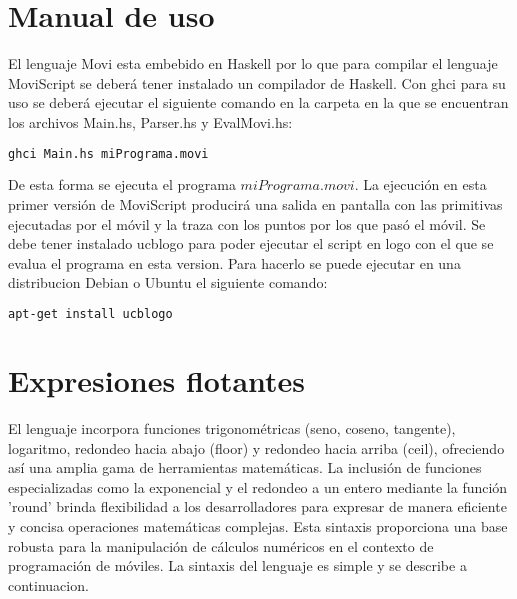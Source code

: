 \documentclass[11pt]{scrartcl}
\begin{document}
\pagebreak
\section{Manual de uso}
El lenguaje Movi esta embebido en Haskell por lo que para compilar el lenguaje MoviScript 
se deber\'a tener instalado un compilador de Haskell. Con ghci para su uso se deber\'a 
ejecutar el siguiente comando en la carpeta en la que se encuentran los archivos Main.hs,
Parser.hs y EvalMovi.hs:
\begin{lstlisting}[language=bash]
    ghci Main.hs miPrograma.movi
\end{lstlisting}
De esta forma se ejecuta el programa $miPrograma.movi$. La ejecuci\'on en esta primer versi\'on de 
MoviScript producir\'a una salida en pantalla con las primitivas ejecutadas por el m\'ovil y la traza
 con los puntos por los que pas\'o el m\'ovil.
 Se debe tener instalado ucblogo para poder ejecutar el script en logo con el que se evalua el 
 programa en esta version. Para hacerlo se puede ejecutar en una distribucion Debian o Ubuntu el siguiente comando:
 \begin{lstlisting}[language=bash]
    apt-get install ucblogo
\end{lstlisting}

\section{Expresiones flotantes}
El lenguaje incorpora funciones trigonom\'etricas 
(seno, coseno, tangente), logaritmo, redondeo hacia abajo (floor) 
y redondeo hacia arriba (ceil), ofreciendo as\'i una amplia gama de herramientas 
matem\'aticas. La inclusi\'on de funciones especializadas como 
la exponencial y el redondeo a un entero mediante la 
función 'round' brinda flexibilidad a los desarrolladores para 
expresar de manera eficiente y concisa operaciones 
matemáticas complejas. Esta sintaxis proporciona una base 
robusta para la manipulación de c\'alculos num\'ericos en 
el contexto de programación de m\'oviles.\newline
La sintaxis del lenguaje es simple y se describe a continuacion. 
\end{document}
